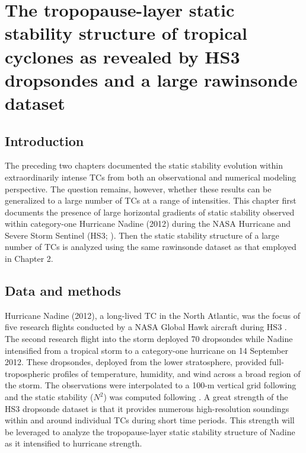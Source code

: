  
\chapter{The tropopause-layer static stability structure of tropical cyclones as revealed by HS3 dropsondes and a large rawinsonde dataset}
\label{chapter:hs3}
\resetfootnote %

\section{Introduction}

The preceding two chapters documented the static stability evolution within extraordinarily intense TCs from both an observational and numerical modeling perspective.
The question remains, however, whether these results can be generalized to a large number of TCs at a range of intensities.
This chapter first documents the presence of large horizontal gradients of static stability observed within category-one Hurricane Nadine (2012) during the NASA Hurricane and Severe Storm Sentinel (HS3; \citeauthor{Braunetal2016} \citeyear{Braunetal2016}).
Then the static stability structure of a large number of TCs is analyzed using the same rawinsonde dataset as that employed in Chapter 2.

\section{Data and methods}
Hurricane Nadine (2012), a long-lived TC in the North Atlantic, was the focus of five research flights conducted by a NASA Global Hawk aircraft during HS3 \citep{Braunetal2016}.
The second research flight into the storm deployed 70 dropsondes \citep{Young2016} while Nadine intensified from a tropical storm to a category-one hurricane \citep{Brown2013} on 14 September 2012.
These dropsondes, deployed from the lower stratosphere, provided full-tropospheric profiles of temperature, humidity, and wind across a broad region of the storm.
The observations were interpolated to a 100-m vertical grid following \cite{MolinariVollaro2010} and the static stability ($N^2$) was computed following \cite{DuranMolinari2018}.
A great strength of the HS3 dropsonde dataset is that it provides numerous high-resolution soundings within and around individual TCs during short time periods.
This strength will be leveraged to analyze the tropopause-layer static stability structure of Nadine as it intensified to hurricane strength.

